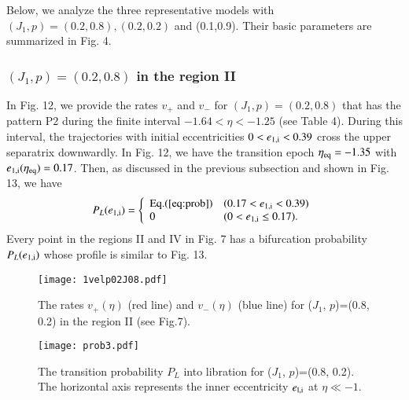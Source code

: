 \documentclass[useAMS,usenatbib,twocolumn]{mn2e}
\begin{document}
Below, we analyze the three representative models with $(J_1,p)=(0.2,0.8),(0.2,0.2)$ and (0.1,0.9).  Their basic parameters are summarized in Fig. 4.  

\subsubsection{$(J_1,p)=(0.2,0.8)$ in the region II}


In Fig.  12, we provide the rates $v_+$ and $v_-$ for $(J_1,p)=(0.2,0.8)$ that has the pattern P2 during the finite interval $-1.64<\eta<-1.25$ (see Table 4). During this interval, the trajectories with initial eccentricities $0<e_{\rm 1,i}<0.39$ cross the upper separatrix downwardly.  
In Fig. 12, we have the transition epoch $\eta_{\rm eq}=-1.35$ with $e_{\rm 1,i}(\eta_{\rm eq})=0.17$.  Then, as discussed in the previous subsection and shown in Fig. 13,  we have 
\begin{eqnarray}
P_L(e_{\rm 1,i})=\left\{ \begin{array}{ll}
{\rm Eq}.(\ref{eq:prob}) & (0.17<e_{\rm 1,i}<0.39) \\
0 & (0<e_{\rm 1,i}\le0.17). \\
\end{array} \right.
\end{eqnarray}
 Every point in the regions II and IV in Fig. 7 has a bifurcation probability $P_L(e_{\rm 1,i})$ whose profile is similar to Fig. 13. 




\begin{figure}
\begin{center}
\texttt{[image: 1velp02J08.pdf]}
\caption{The rates $v_+(\eta)$ (red line) and $v_-(\eta)$ (blue line) for  ($J_1$,
$p$)=(0.8, 0.2) in the region II (see Fig.7). }
\label{fig:vel1}
\end{center}
\end{figure}




\begin{figure}
\begin{center}
\texttt{[image: prob3.pdf]}
\caption{The transition probability $P_L$ into libration for ($J_1$, $p$)=(0.8, 0.2).  The horizontal axis represents 
the inner eccentricity $e_{\rm l,i}$ at $\eta \ll -1$.}
\label{fig:prob1}
\end{center}
\end{figure}
\end{document}

